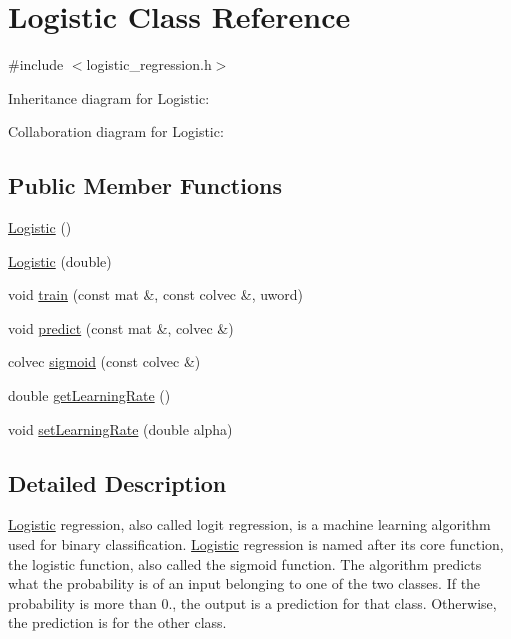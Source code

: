 \hypertarget{classLogistic}{}\section{Logistic Class Reference}
\label{classLogistic}


{\ttfamily \#include $<$logistic\+\_\+regression.\+h$>$}



Inheritance diagram for Logistic\+:


Collaboration diagram for Logistic\+:
\subsection*{Public Member Functions}
\begin{DoxyCompactItemize}
\item 
\hyperlink{classLogistic_ae137bd4c8e3d59f2860b89b4e8a5f43c}{Logistic} ()
\item 
\hyperlink{classLogistic_a274692f0789be6f13f0be7020208fa4a}{Logistic} (double)
\item 
void \hyperlink{classLogistic_a39f2b8b964ae18554a2affd7c3528bff}{train} (const mat \&, const colvec \&, uword)
\item 
void \hyperlink{classLogistic_a84e35026ef7401e5454586936c7d430f}{predict} (const mat \&, colvec \&)
\item 
colvec \hyperlink{classLogistic_af746b2219793f25b26827dba183a2dce}{sigmoid} (const colvec \&)
\item 
double \hyperlink{classLogistic_a084db9a2f532893a6bdfc75551ca9713}{get\+Learning\+Rate} ()
\item 
void \hyperlink{classLogistic_a5c2797f065d02feef3c83e906c408b99}{set\+Learning\+Rate} (double alpha)
\end{DoxyCompactItemize}


\subsection{Detailed Description}
\hyperlink{classLogistic}{Logistic} regression, also called logit regression, is a machine learning algorithm used for binary classification. \hyperlink{classLogistic}{Logistic} regression is named after its core function, the logistic function, also called the sigmoid function. The algorithm predicts what the probability is of an input belonging to one of the two classes. If the probability is more than 0., the output is a prediction for that class. Otherwise, the prediction is for the other class. 

